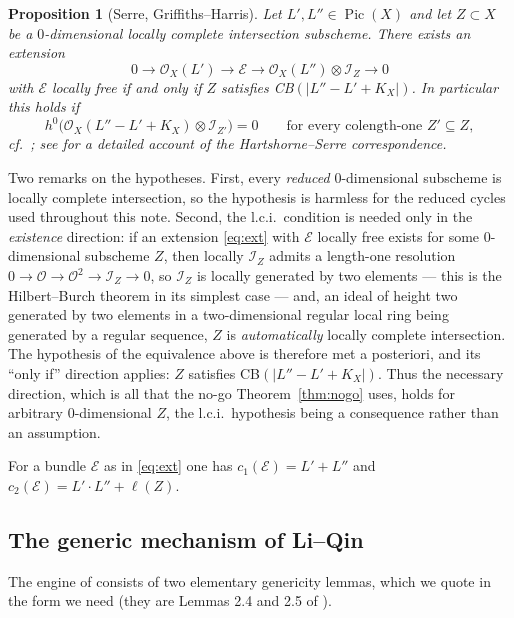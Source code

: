\documentclass{amsart}
\newtheorem{proposition}[theorem]{Proposition}
\theoremstyle{definition}
\newcommand{\OO}{\mathcal{O}}
\newcommand{\EE}{\mathcal{E}}
\newcommand{\II}{\mathcal{I}}
\newcommand{\Pic}{\operatorname{Pic}}
\newcommand{\len}{\ell}
\begin{document}
\begin{proposition}[Serre, Griffiths--Harris]\label{prop:CB}
Let $L',L''\in\Pic(X)$ and let $Z\subset X$ be a $0$-dimensional \emph{locally complete intersection} subscheme. There exists an extension
\begin{equation}\label{eq:ext}
0\longrightarrow \OO_X(L')\longrightarrow \EE\longrightarrow \OO_X(L'')\otimes\II_Z\longrightarrow 0
\end{equation}
with $\EE$ \emph{locally free} if and only if $Z$ satisfies \textup{CB}$(|L''-L'+K_X|)$. In particular this holds if
\begin{equation}\label{eq:strongCB}
h^0\bigl(\OO_X(L''-L'+K_X)\otimes\II_{Z'}\bigr)=0\qquad\text{for every colength-one }Z'\subseteq Z,
\end{equation}
cf.\ \cite[Cor.~2.3]{LQ94}; see \cite{Arr07} for a detailed account of the Hartshorne--Serre correspondence.
\end{proposition}

Two remarks on the hypotheses. First, every \emph{reduced} $0$-dimensional subscheme is locally complete intersection, so the hypothesis is harmless for the reduced cycles used throughout this note. Second, the l.c.i.\ condition is needed only in the \emph{existence} direction: if an extension \eqref{eq:ext} with $\EE$ locally free exists for some $0$-dimensional subscheme $Z$, then locally $\II_Z$ admits a length-one resolution $0\to\OO\to\OO^{2}\to\II_Z\to0$, so $\II_Z$ is locally generated by two elements --- this is the Hilbert--Burch theorem in its simplest case \cite[Thm.~20.15]{Eis95} --- and, an ideal of height two generated by two elements in a two-dimensional regular local ring being generated by a regular sequence, $Z$ is \emph{automatically} locally complete intersection. The hypothesis of the equivalence above is therefore met a posteriori, and its ``only if'' direction applies: $Z$ satisfies CB$(|L''-L'+K_X|)$. Thus the necessary direction, which is all that the no-go Theorem~\ref{thm:nogo} uses, holds for arbitrary $0$-dimensional $Z$, the l.c.i.\ hypothesis being a consequence rather than an assumption.

For a bundle $\EE$ as in \eqref{eq:ext} one has $c_1(\EE)=L'+L''$ and $c_2(\EE)=L'\cdot L''+\len(Z)$.

\subsection{The generic mechanism of Li--Qin}\label{subsec:LQ}
The engine of \cite{LQ94} consists of two elementary genericity lemmas, which we quote in the form we need (they are Lemmas 2.4 and 2.5 of \cite{LQ94}).
\end{document}
